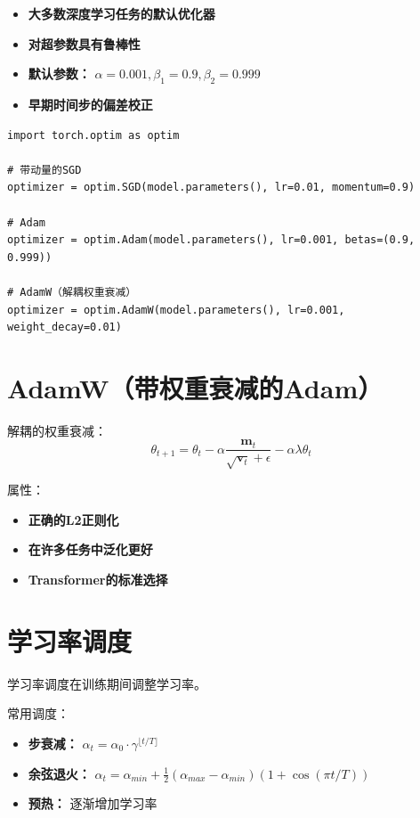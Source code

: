\begin{properties}[Adam属性]
\begin{itemize}
    \item \textbf{大多数深度学习任务的默认优化器}
    \item \textbf{对超参数具有鲁棒性}
    \item \textbf{默认参数：} $\alpha = 0.001, \beta_1 = 0.9, \beta_2 = 0.999$
    \item \textbf{早期时间步的偏差校正}
\end{itemize}
\end{properties}

\begin{code}
    \label{code:optimizer_chinese}
\begin{verbatim}
import torch.optim as optim

# 带动量的SGD
optimizer = optim.SGD(model.parameters(), lr=0.01, momentum=0.9)

# Adam
optimizer = optim.Adam(model.parameters(), lr=0.001, betas=(0.9, 0.999))

# AdamW（解耦权重衰减）
optimizer = optim.AdamW(model.parameters(), lr=0.001, weight_decay=0.01)
\end{verbatim}
\end{code}

\section{AdamW（带权重衰减的Adam）}

解耦的权重衰减：
\begin{equation}
\theta_{t+1} = \theta_t - \alpha \frac{\mathbf{m}_t}{\sqrt{\mathbf{v}_t} + \epsilon} - \alpha \lambda \theta_t
\end{equation}

属性：
\begin{itemize}
    \item \textbf{正确的L2正则化}
    \item \textbf{在许多任务中泛化更好}
    \item \textbf{Transformer的标准选择}
\end{itemize}

\section{学习率调度}

学习率调度在训练期间调整学习率。

常用调度：
\begin{itemize}
    \item \textbf{步衰减：} $\alpha_t = \alpha_0 \cdot \gamma^{\lfloor t/T \rfloor}$
    \item \textbf{余弦退火：} $\alpha_t = \alpha_{min} + \frac{1}{2}(\alpha_{max} - \alpha_{min})(1 + \cos(\pi t/T))$
    \item \textbf{预热：} 逐渐增加学习率
\end{itemize}

